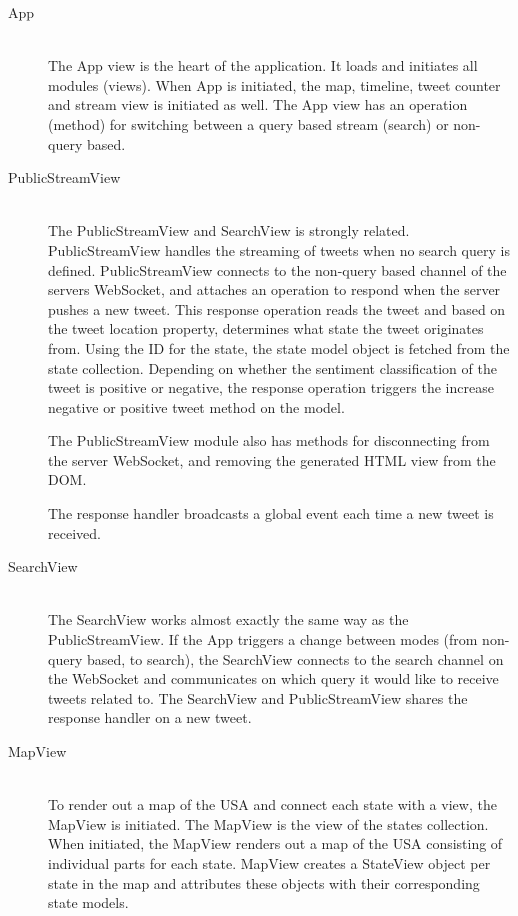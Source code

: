 \begin{description}
\item[App] \hfill \\
The App view is the heart of the application. It loads and initiates all modules (views). When App is initiated, the map, timeline, tweet counter and stream view is initiated as well. The App view has an operation (method) for switching between a query based stream (search) or non-query based.

\item[PublicStreamView] \hfill \\

The PublicStreamView and SearchView is strongly related. PublicStreamView handles the streaming of tweets when no search query is defined. PublicStreamView connects to the non-query based channel of the servers WebSocket, and attaches an operation to respond when the server pushes a new tweet. This response operation reads the tweet and based on the tweet location property, determines what state the tweet originates from. Using the ID for the state, the state model object is fetched from the state collection. Depending on whether the sentiment classification of the tweet is positive or negative, the response operation triggers the increase negative or positive tweet method on the model.

The PublicStreamView module also has methods for disconnecting from the server WebSocket, and removing the generated HTML view from the DOM.

The response handler broadcasts a global event each time a new tweet is received. 

\item[SearchView] \hfill \\

The SearchView works almost exactly the same way as the PublicStreamView. If the App triggers a change between modes (from non-query based, to search), the SearchView connects to the search channel on the WebSocket and communicates on which query it would like to receive tweets related to. The SearchView and PublicStreamView shares the response handler on a new tweet.

\item[MapView] \hfill \\

To render out a map of the USA and connect each state with a view, the MapView is initiated. The MapView is the view of the states collection. When initiated, the MapView renders out a map of the USA consisting of individual parts for each state. MapView creates a StateView object per state in the map and attributes these objects with their corresponding state models.


\end{description}
